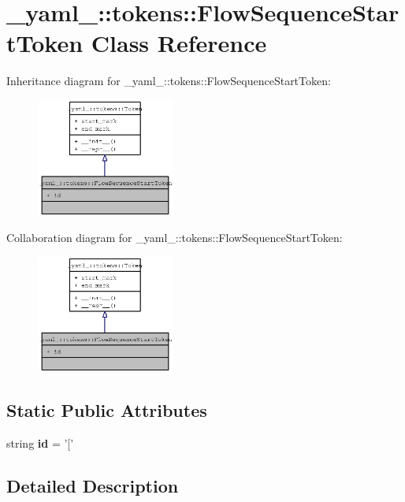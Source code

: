 \section{\_\-yaml\_\-::tokens::FlowSequenceStartToken Class Reference}
\label{class__yaml___1_1tokens_1_1FlowSequenceStartToken}
Inheritance diagram for \_\-yaml\_\-::tokens::FlowSequenceStartToken:\nopagebreak
\begin{figure}[H]
\begin{center}
\leavevmode
\includegraphics[width=129pt]{class__yaml___1_1tokens_1_1FlowSequenceStartToken__inherit__graph}
\end{center}
\end{figure}
Collaboration diagram for \_\-yaml\_\-::tokens::FlowSequenceStartToken:\nopagebreak
\begin{figure}[H]
\begin{center}
\leavevmode
\includegraphics[width=129pt]{class__yaml___1_1tokens_1_1FlowSequenceStartToken__coll__graph}
\end{center}
\end{figure}
\subsection*{Static Public Attributes}
\begin{CompactItemize}
\item 
string {\bf id} = '['
\end{CompactItemize}


\subsection{Detailed Description}


